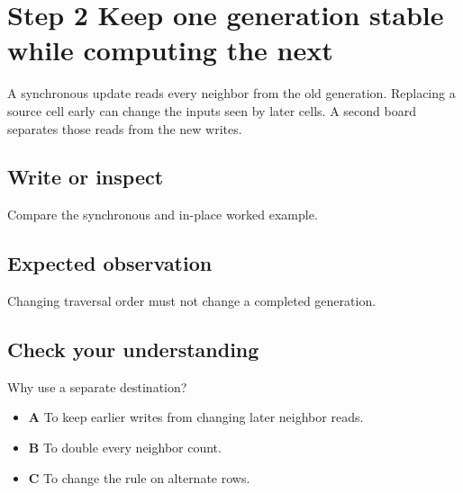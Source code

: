 \section{Step 2 Keep one generation stable while computing the
  next}\label{008-life-generations-s02-step-2-keep-one-generation-stable-while-computing-the-next}

A synchronous update reads every neighbor from the old generation.
Replacing a source cell early can change the inputs seen by later cells.
A second board separates those reads from the new writes.

\subsection{Write or
  inspect}\label{008-life-generations-s02-write-or-inspect}

Compare the synchronous and in-place worked example.

\subsection{Expected
  observation}\label{008-life-generations-s02-expected-observation}

Changing traversal order must not change a completed generation.

\subsection{Check your
  understanding}\label{008-life-generations-s02-check-your-understanding}

Why use a separate destination?

\begin{itemize}
  \tightlist
  \item
        \textbf{A} To keep earlier writes from changing later neighbor reads.
  \item
        \textbf{B} To double every neighbor count.
  \item
        \textbf{C} To change the rule on alternate rows.
\end{itemize}
